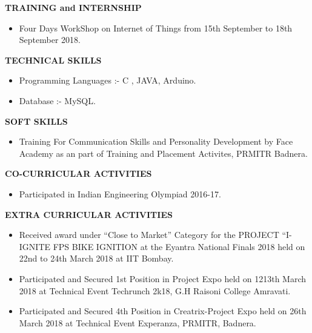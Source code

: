\documentclass[a4paper,20pt]{article}
\begin{document}
\textbf{\large {TRAINING and INTERNSHIP }}
\begin{itemize}

\item \noindent Four Days WorkShop on Internet of Things from 15th September to 18th September 2018.
\newline
\end{itemize}



 
 

\textbf{\large {TECHNICAL SKILLS} }

\begin{itemize}
	\item \noindent Programming Languages :- C , JAVA, Arduino. 
	\item \noindent Database :- MySQL.
\newline		
\end{itemize}


\textbf{\large {SOFT SKILLS} }
\begin{itemize}
	\item \noindent Training For Communication Skills and Personality Development by Face Academy as an part of Training and Placement Activites, PRMITR Badnera.
	\newline
\end{itemize}

\textbf{\large {CO-CURRICULAR ACTIVITIES } }
\begin{itemize}
	\item \noindent Participated in Indian Engineering Olympiad 2016-17.
	\newline
\end{itemize}
\newpage
\textbf{\large {EXTRA CURRICULAR ACTIVITIES } }
\begin{itemize}
	\item \noindent Received award under “Close to Market” Category for the PROJECT “I-IGNITE FPS BIKE IGNITION at the Eyantra National Finals 2018 held on 22nd to 24th March 2018 at IIT Bombay. 
	\item \noindent Participated and Secured 1st Position in Project Expo held on 1213th March 2018 at Technical Event Techrunch 2k18, G.H Raisoni College Amravati. 
	\item \noindent Participated and Secured 4th Position in Creatrix-Project Expo held on 26th March 2018 at Technical Event Experanza, PRMITR, Badnera.
	\newline
\end{itemize}
\end{document}
